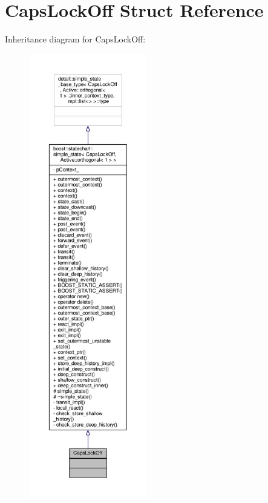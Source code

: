 \hypertarget{struct_caps_lock_off}{}\section{Caps\+Lock\+Off Struct Reference}
\label{struct_caps_lock_off}


Inheritance diagram for Caps\+Lock\+Off\+:
\nopagebreak
\begin{figure}[H]
\begin{center}
\leavevmode
\includegraphics[height=550pt]{struct_caps_lock_off__inherit__graph}
\end{center}
\end{figure}


